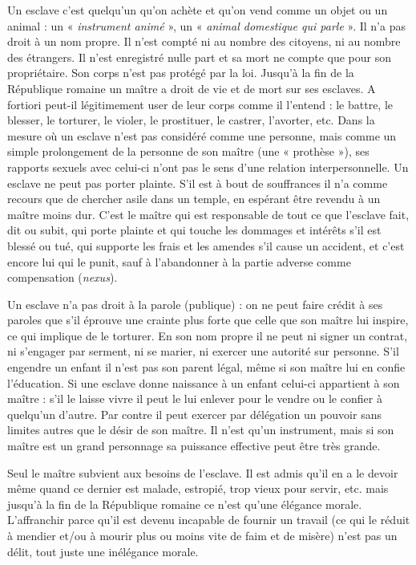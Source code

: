 Un esclave c'est quelqu'un qu'on achète et qu'on vend comme un
objet ou un animal : un « \emph{instrument animé} », un « \emph{animal
domestique qui parle} ». Il n'a pas droit à un nom propre. Il n'est compté ni au nombre des citoyens,
ni au nombre des étrangers. Il n'est enregistré nulle part et sa
mort ne compte que pour son propriétaire. Son corps n'est pas protégé
par la loi. Jusqu'à la fin de la République romaine un maître a droit de vie
et de mort sur ses esclaves. A fortiori peut-il légitimement user de leur
corps comme il l'entend : le battre, le blesser, le torturer, le violer, le
prostituer, le castrer, l'avorter, etc. Dans la mesure où un esclave n'est
pas considéré comme une personne, mais comme un simple prolongement
de la personne de son maître (une « prothèse »), ses rapports
sexuels avec celui-ci n'ont pas le sens d'une relation interpersonnelle.
Un esclave ne peut pas porter plainte. S'il est à bout de souffrances
il n'a comme recours que de chercher asile dans un temple, en espérant
être revendu à un maître moins dur. C'est le maître qui est responsable
de tout ce que l'esclave fait, dit ou subit, qui porte plainte et qui
touche les dommages et intérêts s'il est blessé ou tué, qui supporte les
frais et les amendes s'il cause un accident, et c'est encore lui qui le punit,
sauf à l'abandonner à la partie adverse comme compensation (\emph{nexus}).

Un esclave n'a pas droit à la parole (publique) : on ne peut faire
crédit à ses paroles que s'il éprouve une crainte plus forte que celle que
son maître lui inspire, ce qui implique de le torturer. En son nom propre
il ne peut ni signer un contrat, ni s'engager par serment, ni se marier, ni
exercer une autorité sur personne. S'il engendre un enfant il n'est pas son
parent légal, même si son maître lui en confie l'éducation. Si une esclave
donne naissance à un enfant celui-ci appartient à son maître : s'il le laisse
vivre il peut le lui enlever pour le vendre ou le confier à quelqu'un d'autre.
Par contre il peut exercer par délégation un pouvoir sans limites autres
que le désir de son maître. Il n'est qu'un instrument, mais si son maître
est un grand personnage sa puissance effective peut être très grande.

Seul le maître subvient aux besoins de l'esclave. Il est admis qu'il
en a le devoir même quand ce dernier est malade, estropié, trop vieux
pour servir, etc. mais jusqu'à la fin de la République romaine ce n'est
qu'une élégance morale. L'affranchir parce qu'il est devenu incapable de
fournir un travail (ce qui le réduit à mendier et/ou à mourir plus ou
moins vite de faim et de misère) n'est pas un délit, tout juste une inélégance
morale.

